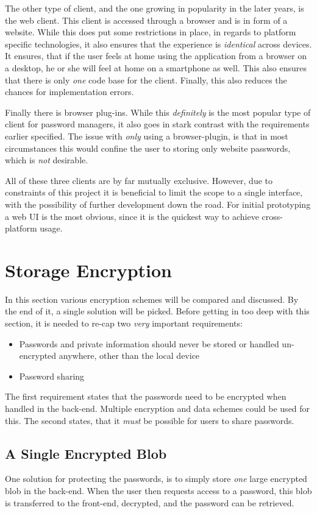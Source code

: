 		The other type of client, and the one growing in popularity in the later years, is the web client. This client is accessed through a browser and is in form of a website. While this does put some restrictions in place, in regards to platform specific technologies, it also ensures that the experience is \emph{identical} across devices. It ensures, that if the user feels at home using the application from a browser on a desktop, he or she will feel at home on a smartphone as well. This also ensures that there is only \emph{one} code base for the client. Finally, this also reduces the chances for implementation errors.

		Finally there is browser plug-ins. While this \emph{definitely} is the most popular type of client for password managers, it also goes in stark contrast with the requirements earlier specified. The issue with \emph{only} using a browser-plugin, is that in most circumstances this would confine the user to storing only website passwords, which is \emph{not} desirable.

		All of these three clients are by far mutually exclusive. However, due to constraints of this project it is beneficial to limit the scope to a single interface, with the possibility of further development down the road. For initial prototyping a web UI is the most obvious, since it is the quickest way to achieve cross-platform usage. 

	\section{Storage Encryption}
		In this section various encryption schemes will be compared and discussed. By the end of it, a single solution will be picked. Before getting in too deep with this section, it is needed to re-cap two \emph{very} important requirements:
		\begin{itemize}
			\item Passwords and private information should never be stored or handled un-encrypted anywhere, other than the local device
			\item Password sharing
		\end{itemize}

		The first requirement states that the passwords need to be encrypted when handled in the back-end. Multiple encryption and data schemes could be used for this. The second states, that it \emph{must} be possible for users to share passwords.

		\subsection{A Single Encrypted Blob}
			One solution for protecting the passwords, is to simply store \emph{one} large encrypted blob in the back-end. When the user then requests access to a password, this blob is transferred to the front-end, decrypted, and the password can be retrieved. 

